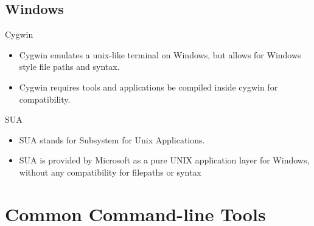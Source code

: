 \documentclass[10pt]{beamer}
\begin{document}
\subsection{Windows}
\begin{frame}{Cygwin}
\begin{itemize}[<+->]
\item Cygwin emulates a unix-like terminal on Windows, but allows for Windows style file paths and syntax.
\item Cygwin requires tools and applications be compiled inside cygwin for compatibility.
\end{itemize}
\end{frame}

\begin{frame}{SUA}
\begin{itemize}[<+->]
\item SUA stands for Subsystem for Unix Applications.
\item SUA is provided by Microsoft as a pure UNIX application layer for Windows, without any compatibility for filepaths or syntax
\end{itemize}
\end{frame}

\section{Common Command-line Tools}
\end{document}
